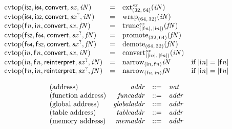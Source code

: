 $$
\begin{array}{@{}lcl@{}l@{}}
{\mathrm{cvtop}}(\mathsf{i{\scriptstyle32}}, \mathsf{i{\scriptstyle64}}, \mathsf{convert}, {\mathit{sx}}, {\mathit{iN}}) &=& {{{{\mathrm{ext}}}_{(32,\, 64)}^{{\mathit{sx}}}}}{({\mathit{iN}})} &  \\
{\mathrm{cvtop}}(\mathsf{i{\scriptstyle64}}, \mathsf{i{\scriptstyle32}}, \mathsf{convert}, {{\mathit{sx}}^?}, {\mathit{iN}}) &=& {{{\mathrm{wrap}}}_{(64,\, 32)}}{({\mathit{iN}})} &  \\
{\mathrm{cvtop}}({\mathsf{f}}{{\mathit{n}}}, {\mathsf{i}}{{\mathit{n}}}, \mathsf{convert}, {\mathit{sx}}, {\mathit{fN}}) &=& {{{{\mathrm{trunc}}}_{({|{\mathsf{f}}{{\mathit{n}}}|},\, {|{\mathsf{i}}{{\mathit{n}}}|})}^{{\mathit{sx}}}}}{({\mathit{fN}})} &  \\
{\mathrm{cvtop}}(\mathsf{f{\scriptstyle32}}, \mathsf{f{\scriptstyle64}}, \mathsf{convert}, {{\mathit{sx}}^?}, {\mathit{fN}}) &=& {{{\mathrm{promote}}}_{(32,\, 64)}}{({\mathit{fN}})} &  \\
{\mathrm{cvtop}}(\mathsf{f{\scriptstyle64}}, \mathsf{f{\scriptstyle32}}, \mathsf{convert}, {{\mathit{sx}}^?}, {\mathit{fN}}) &=& {{{\mathrm{demote}}}_{(64,\, 32)}}{({\mathit{fN}})} &  \\
{\mathrm{cvtop}}({\mathsf{i}}{{\mathit{n}}}, {\mathsf{f}}{{\mathit{n}}}, \mathsf{convert}, {\mathit{sx}}, {\mathit{iN}}) &=& {{{{\mathrm{convert}}}_{({|{\mathsf{i}}{{\mathit{n}}}|},\, {|{\mathsf{f}}{{\mathit{n}}}|})}^{{\mathit{sx}}}}}{({\mathit{iN}})} &  \\
{\mathrm{cvtop}}({\mathsf{i}}{{\mathit{n}}}, {\mathsf{f}}{{\mathit{n}}}, \mathsf{reinterpret}, {{\mathit{sx}}^?}, {\mathit{iN}}) &=& {{{\mathrm{narrow}}}_{({\mathsf{i}}{{\mathit{n}}},\, {\mathsf{f}}{{\mathit{n}}})}}{{\mathit{iN}}} &\quad
  \mbox{if}~{|{\mathsf{i}}{{\mathit{n}}}|} = {|{\mathsf{f}}{{\mathit{n}}}|} \\
{\mathrm{cvtop}}({\mathsf{f}}{{\mathit{n}}}, {\mathsf{i}}{{\mathit{n}}}, \mathsf{reinterpret}, {{\mathit{sx}}^?}, {\mathit{fN}}) &=& {{{\mathrm{narrow}}}_{({\mathsf{f}}{{\mathit{n}}},\, {\mathsf{i}}{{\mathit{n}}})}}{{\mathit{fN}}} &\quad
  \mbox{if}~{|{\mathsf{i}}{{\mathit{n}}}|} = {|{\mathsf{f}}{{\mathit{n}}}|} \\
\end{array}
$$

$$
\begin{array}{@{}lrrl@{}l@{}}
\mbox{(address)} & {\mathit{addr}} &::=& {\mathit{nat}} \\
\mbox{(function address)} & {\mathit{funcaddr}} &::=& {\mathit{addr}} \\
\mbox{(global address)} & {\mathit{globaladdr}} &::=& {\mathit{addr}} \\
\mbox{(table address)} & {\mathit{tableaddr}} &::=& {\mathit{addr}} \\
\mbox{(memory address)} & {\mathit{memaddr}} &::=& {\mathit{addr}} \\
\end{array}
$$

